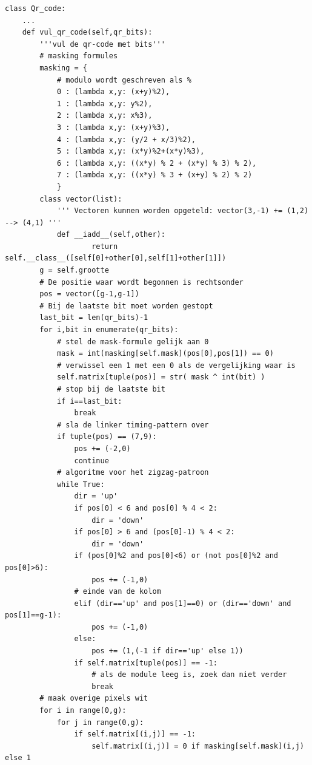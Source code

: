 \documentclass[a4paper]{article}
\begin{document}
\begin{verbatim}
class Qr_code:
    ...
    def vul_qr_code(self,qr_bits):
        '''vul de qr-code met bits'''
        # masking formules
        masking = {
            # modulo wordt geschreven als %
            0 : (lambda x,y: (x+y)%2),
            1 : (lambda x,y: y%2),
            2 : (lambda x,y: x%3),
            3 : (lambda x,y: (x+y)%3),
            4 : (lambda x,y: (y/2 + x/3)%2),
            5 : (lambda x,y: (x*y)%2+(x*y)%3),
            6 : (lambda x,y: ((x*y) % 2 + (x*y) % 3) % 2),
            7 : (lambda x,y: ((x*y) % 3 + (x+y) % 2) % 2)
            }
        class vector(list):
            ''' Vectoren kunnen worden opgeteld: vector(3,-1) += (1,2) --> (4,1) '''
            def __iadd__(self,other):
                    return self.__class__([self[0]+other[0],self[1]+other[1]])
        g = self.grootte
        # De positie waar wordt begonnen is rechtsonder
        pos = vector([g-1,g-1])
        # Bij de laatste bit moet worden gestopt
        last_bit = len(qr_bits)-1
        for i,bit in enumerate(qr_bits):
            # stel de mask-formule gelijk aan 0
            mask = int(masking[self.mask](pos[0],pos[1]) == 0)
            # verwissel een 1 met een 0 als de vergelijking waar is
            self.matrix[tuple(pos)] = str( mask ^ int(bit) )
            # stop bij de laatste bit
            if i==last_bit:
                break
            # sla de linker timing-pattern over
            if tuple(pos) == (7,9):
                pos += (-2,0)
                continue
            # algoritme voor het zigzag-patroon
            while True:
                dir = 'up'
                if pos[0] < 6 and pos[0] % 4 < 2:
                    dir = 'down'
                if pos[0] > 6 and (pos[0]-1) % 4 < 2:
                    dir = 'down'
                if (pos[0]%2 and pos[0]<6) or (not pos[0]%2 and pos[0]>6):
                    pos += (-1,0)
                # einde van de kolom
                elif (dir=='up' and pos[1]==0) or (dir=='down' and pos[1]==g-1):
                    pos += (-1,0)
                else:
                    pos += (1,(-1 if dir=='up' else 1))
                if self.matrix[tuple(pos)] == -1:
                    # als de module leeg is, zoek dan niet verder
                    break
        # maak overige pixels wit
        for i in range(0,g):
            for j in range(0,g):
                if self.matrix[(i,j)] == -1:
                    self.matrix[(i,j)] = 0 if masking[self.mask](i,j) else 1
\end{verbatim}
\end{document}
